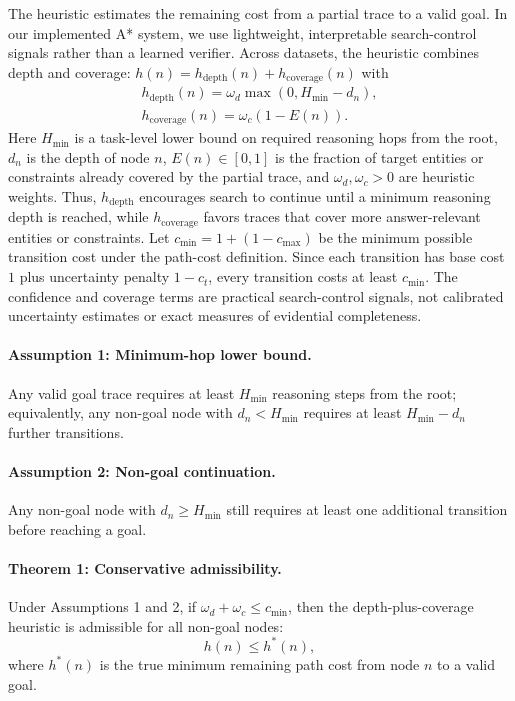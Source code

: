 \documentclass[11pt]{article}
\begin{document}
The heuristic estimates the remaining cost from a partial trace to a valid goal. In our implemented A* system, we use lightweight, interpretable search-control signals rather than a learned verifier. Across datasets, the heuristic combines depth and coverage: $h(n)=h_{\mathrm{depth}}(n)+h_{\mathrm{coverage}}(n)$ with
\begin{multline}
h_{\mathrm{depth}}(n)=\omega_d\max(0,H_{\min}-d_n),
\\
h_{\mathrm{coverage}}(n)=\omega_c(1-E(n)).
\end{multline}
Here \(H_{\min}\) is a task-level lower bound on required reasoning hops from the root, \(d_n\) is the depth of node \(n\), \(E(n)\in[0,1]\) is the fraction of target entities or constraints already covered by the partial trace, and \(\omega_d,\omega_c>0\) are heuristic weights. Thus, \(h_{\mathrm{depth}}\) encourages search to continue until a minimum reasoning depth is reached, while \(h_{\mathrm{coverage}}\) favors traces that cover more answer-relevant entities or constraints. Let $c_{\min}=1+(1-c_{\max})$ be the minimum possible transition cost under the path-cost definition. Since each transition has base cost \(1\) plus uncertainty penalty \(1-c_t\), every transition costs at least \(c_{\min}\). The confidence and coverage terms are practical search-control signals, not calibrated uncertainty estimates or exact measures of evidential completeness.

\paragraph{Assumption 1: Minimum-hop lower bound.}
Any valid goal trace requires at least \(H_{\min}\) reasoning steps from the root; equivalently, any non-goal node with \(d_n < H_{\min}\) requires at least \(H_{\min}-d_n\) further transitions.

\paragraph{Assumption 2: Non-goal continuation.}
Any non-goal node with \(d_n\geq H_{\min}\) still requires at least one additional transition before reaching a goal.

\paragraph{Theorem 1: Conservative admissibility.}
Under Assumptions 1 and 2, if \(\omega_d+\omega_c\leq c_{\min}\), then the depth-plus-coverage heuristic is admissible for all non-goal nodes:
\[
h(n)\leq h^*(n),
\]
where \(h^*(n)\) is the true minimum remaining path cost from node \(n\) to a valid goal.
\end{document}
